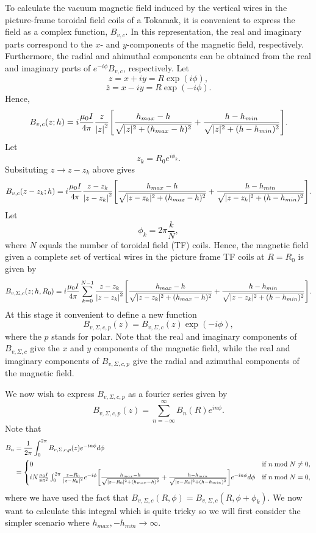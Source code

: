 \documentclass{article}
\begin{document}
To calculate the vacuum magnetic field induced by the vertical wires in the picture-frame toroidal
field coils of a Tokamak, it is convenient to express the field as a complex function, \( B_{v,c} \).
In this representation, the real and imaginary parts correspond to the \( x \)- and \( y \)-components
of the magnetic field, respectively. Furthermore, the radial and ahimuthal components can be obtained
from the real and imaginary parts of \( e^{-i\phi} B_{v,c} \), respectively.
Let
\[z = x + i y = R\exp(i\phi),\]
\[\bar{z} = x - iy = R \exp(-i\phi).\]
Hence,
\[B_{v,c}(z; h) = i\frac{\mu_0I}{4\pi}\frac{z}{\abs{z}^2}\qty[\frac{h_{max}-h}{\sqrt{|z|^2+(h_{max}-h)^2}} + \frac{h-h_{min}}{\sqrt{|z|^2+(h-h_{min})^2}}].\]
Let
\[z_k = R_0 e^{i\phi_k}.\]
Subsituting $z\rightarrow z- z_k$ above gives
\[B_{v,c}(z-z_k; h) = i\frac{\mu_0I}{4\pi}\frac{z-z_k}{\abs{z-z_k}^2}\qty[\frac{h_{max}-h}{\sqrt{|z-z_k|^2+(h_{max}-h)^2}} + \frac{h-h_{min}}{\sqrt{|z-z_k|^2+(h-h_{min})^2}}].\]
Let
\[\phi_k = 2\pi\frac{k}{N},\]
where $N$ equals the number of toroidal field (TF) coils. Hence, the magnetic field given a complete set of vertical wires
in the picture frame TF coils at $R=R_0$ is given by
\[B_{v,\Sigma,c}(z; h, R_0) = i\frac{\mu_0I}{4\pi}\sum_{k=0}^{N-1}\frac{z-z_k}{\abs{z-z_k}^2}\qty[\frac{h_{max}-h}{\sqrt{|z-z_k|^2+(h_{max}-h)^2}} + \frac{h-h_{min}}{\sqrt{|z-z_k|^2+(h-h_{min})^2}}].\]
At this stage it convenient to define a new function
\[B_{v,\Sigma,c,p}(z) = B_{v,\Sigma,c}(z)\exp(-i\phi),\]
where the $p$ stands for polar. Note that the real and imaginary components of $B_{v,\Sigma,c}$ give
the $x$ and $y$ components of the magnetic field, while the real and imaginary components of $B_{v,\Sigma,c,p}$
give the radial and azimuthal components of the magnetic field.

We now wish to express $B_{v,\Sigma,c,p}$ as a fourier series given by
\[B_{v,\Sigma,c,p}(z)=\sum_{n=-\infty}^\infty B_n(R) e^{in\phi}.\]
Note that
\[\begin{aligned}
B_n &= \frac{1}{2\pi}\int_0^{2\pi} B_{v,\Sigma,c,p}(z) e^{-in\phi}d\phi \\
&=\begin{cases}
    0 & \text{if } n \bmod N \ne 0, \\
    iN\frac{\mu_0I}{8\pi^2}\int_0^{2\pi}\frac{z-R_0}{\abs{z-R_0}^2}e^{-i\phi}\qty[\frac{h_{max}-h}{\sqrt{|z-R_0|^2+(h_{max}-h)^2}} + \frac{h-h_{min}}{\sqrt{|z-R_0|^2+(h-h_{min})^2}}]e^{-in\phi}d\phi & \text{if } n \bmod N = 0,
\end{cases}
\end{aligned}\]
where we have used the fact that $B_{v,\Sigma, c}(R, \phi) = B_{v,\Sigma, c}(R, \phi + \phi_k)$.
We now want to calculate this integral which is quite tricky so we will first consider the simpler scenario
where $h_{max},-h_{min}\rightarrow\infty$.
\end{document}
